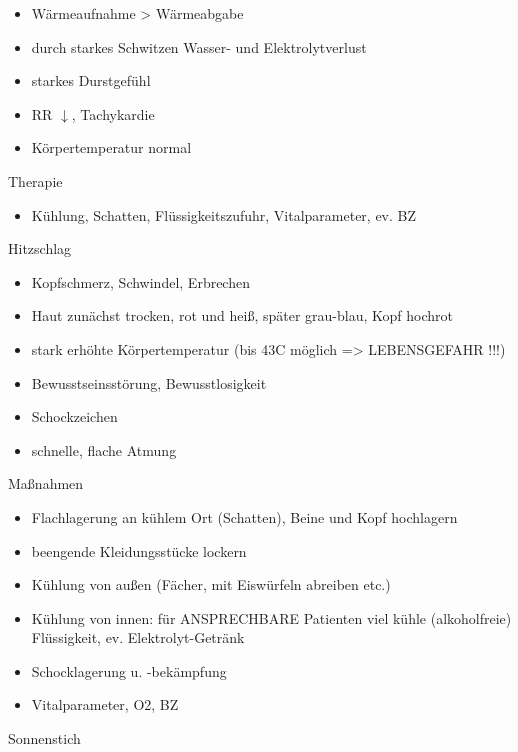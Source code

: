\documentclass{article}
\begin{document}
\begin{itemize}
\item W\"armeaufnahme {\textgreater}  W\"armeabgabe

\item durch starkes Schwitzen Wasser- und  Elektrolytverlust

\item starkes Durstgef\"uhl

\item RR ${\downarrow}$, Tachykardie

\item K\"orpertemperatur normal

\end{itemize}
Therapie

\begin{itemize}
\item K\"uhlung, Schatten,  Fl\"ussigkeitszufuhr, Vitalparameter, ev. 
BZ 

\end{itemize}
Hitzschlag

\begin{itemize}
\item Kopfschmerz, Schwindel, Erbrechen

\item Haut zun\"achst trocken, rot und hei{\ss},  sp\"ater grau-blau,
Kopf hochrot

\item stark  erh\"ohte  K\"orpertemperatur (bis  43{\textdegree}C
m\"oglich ={\textgreater} LEBENSGEFAHR !!!)

\item Bewusstseinsst\"orung, Bewusstlosigkeit

\item Schockzeichen

\item schnelle, flache Atmung

\end{itemize}
Ma{\ss}nahmen

\begin{itemize}
\item Flachlagerung an k\"uhlem Ort (Schatten), Beine und Kopf
hochlagern

\item beengende Kleidungsst\"ucke lockern

\item K\"uhlung von au{\ss}en (F\"acher, mit Eisw\"urfeln abreiben etc.)

\item K\"uhlung von innen: f\"ur ANSPRECHBARE Patienten viel k\"uhle
(alkoholfreie) Fl\"ussigkeit, ev. Elektrolyt-Getr\"ank

\item Schocklagerung u. -bek\"ampfung

\item Vitalparameter, O2, BZ

\end{itemize}
Sonnenstich
\end{document}
